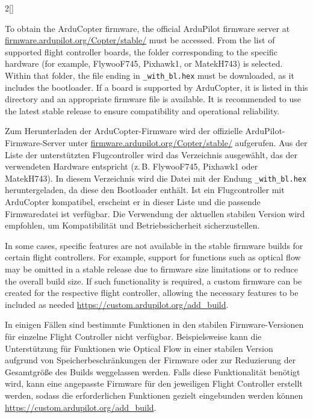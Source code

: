 \begin{paracol}{2}[]
\coleng

To obtain the ArduCopter firmware, the official ArduPilot firmware server at \url{firmware.ardupilot.org/Copter/stable/} must be accessed. From the list of supported flight controller boards, the folder corresponding to the specific hardware (for example, FlywooF745, Pixhawk1, or MatekH743) is selected. Within that folder, the file ending in \verb!_with_bl.hex! must be downloaded, as it includes the bootloader. If a board is supported by ArduCopter, it is listed in this directory and an appropriate firmware file is available. It is recommended to use the latest stable release to ensure compatibility and operational reliability.

\colger

Zum Herunterladen der ArduCopter-Firmware wird der offizielle ArduPilot-Firmware-Server unter \url{firmware.ardupilot.org/Copter/stable/} aufgerufen. Aus der Liste der unterstützten Flugcontroller wird das Verzeichnis ausgewählt, das der verwendeten Hardware entspricht (z.\,B. FlywooF745, Pixhawk1 oder MatekH743). In diesem Verzeichnis wird die Datei mit der Endung \verb!_with_bl.hex! heruntergeladen, da diese den Bootloader enthält. Ist ein Flugcontroller mit ArduCopter kompatibel, erscheint er in dieser Liste und die passende Firmwaredatei ist verfügbar. Die Verwendung der aktuellen stabilen Version wird empfohlen, um Kompatibilität und Betriebssicherheit sicherzustellen.

\coleng

In some cases, specific features are not available in the stable firmware builds for certain flight controllers. For example, support for functions such as optical flow may be omitted in a stable release due to firmware size limitations or to reduce the overall build size. If such functionality is required, a custom firmware can be created for the respective flight controller, allowing the necessary features to be included as needed \url{https://custom.ardupilot.org/add_build}.

\colger

In einigen Fällen sind bestimmte Funktionen in den stabilen Firmware-Versionen für einzelne Flight Controller nicht verfügbar. Beispielsweise kann die Unterstützung für Funktionen wie Optical Flow in einer stabilen Version aufgrund von Speicherbeschränkungen der Firmware oder zur Reduzierung der Gesamtgröße des Builds weggelassen werden. Falls diese Funktionalität benötigt wird, kann eine angepasste Firmware für den jeweiligen Flight Controller erstellt werden, sodass die erforderlichen Funktionen gezielt eingebunden werden können \url{https://custom.ardupilot.org/add_build}.


\end{paracol}
